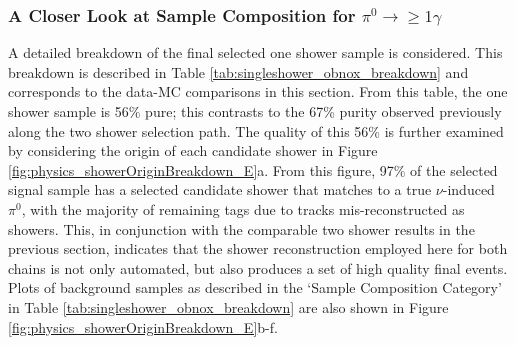 \subsubsection{A Closer Look at Sample Composition for $\pi^0\rightarrow\geq 1 \gamma$} 
A detailed breakdown of the final selected one shower sample is considered.  This breakdown is described in Table \ref{tab:singleshower_obnox_breakdown} and corresponds to the data-MC comparisons in this section. From this table, the one shower sample is 56\% pure; this contrasts to the 67\% purity observed previously along the two shower selection path.  The quality of this 56\% is further examined by considering the origin of each candidate shower in Figure \ref{fig:physics_showerOriginBreakdown_E}a.  From this figure, 97\% of the selected signal sample has a selected candidate shower that matches to a true $\nu$-induced $\pi^0$, with the majority of remaining tags due to tracks mis-reconstructed as showers. This, in conjunction with the comparable two shower results in the previous section, indicates that the shower reconstruction employed here for both chains is not only automated, but also produces a set of high quality final events.  Plots of background samples as described in the `Sample Composition Category' in Table \ref{tab:singleshower_obnox_breakdown} are also shown in Figure \ref{fig:physics_showerOriginBreakdown_E}b-f.  %


